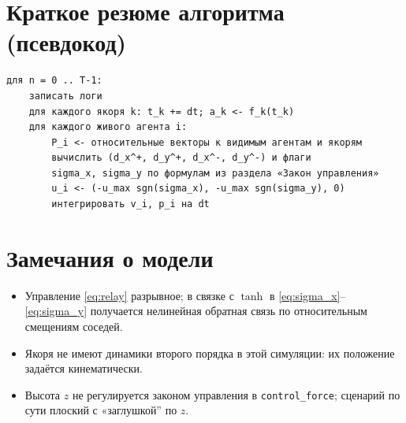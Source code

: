 \documentclass[12pt,a4paper]{article}
\begin{document}
\section{Краткое резюме алгоритма (псевдокод)}

\begin{verbatim}
для n = 0 .. T-1:
    записать логи
    для каждого якоря k: t_k += dt; a_k <- f_k(t_k)
    для каждого живого агента i:
        P_i <- относительные векторы к видимым агентам и якорям
        вычислить (d_x^+, d_y^+, d_x^-, d_y^-) и флаги
        sigma_x, sigma_y по формулам из раздела «Закон управления»
        u_i <- (-u_max sgn(sigma_x), -u_max sgn(sigma_y), 0)
        интегрировать v_i, p_i на dt
\end{verbatim}

\section{Замечания о модели}

\begin{itemize}
  \item Управление \eqref{eq:relay} разрывное; в связке с $\tanh$ в \eqref{eq:sigma_x}--\eqref{eq:sigma_y} получается нелинейная обратная связь по относительным смещениям соседей.
  \item Якоря не имеют динамики второго порядка в этой симуляции: их положение задаётся кинематически.
  \item Высота $z$ не регулируется законом управления в \texttt{control\_force}; сценарий по сути плоский с «заглушкой'' по $z$.
\end{itemize}
\end{document}
